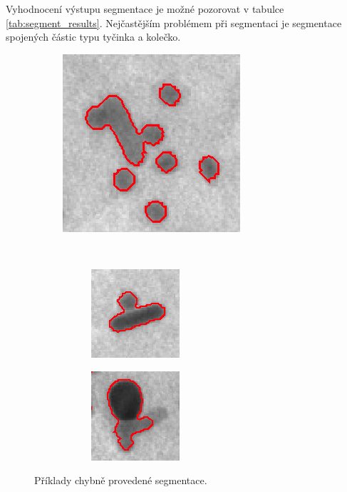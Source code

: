 \documentclass[11pt,twoside,a4paper,table]{book}
\begin{document}
Vyhodnocení výstupu segmentace je možné pozorovat v tabulce \ref{tab:segment_results}. Nejčastějším problémem při segmentaci je segmentace spojených částic typu tyčinka a kolečko.  

\begin{figure}[ht]
	\begin{center}
	\begin{subfigure}[l]{0.45\textwidth}
		\includegraphics[scale=1]{figures/segment_problem1.png}
	\end{subfigure}
	~
	\begin{subfigure}[r]{0.45\textwidth}
		\begin{subfigure}[b]{\textwidth}
			\includegraphics[scale=1]{figures/segment_problem2.png}
		\end{subfigure}
	
		\begin{subfigure}[b]{\textwidth}
			\includegraphics[scale=1]{figures/segment_problem3.png}
		\end{subfigure}
	\end{subfigure}
	\end{center}
	\caption{Příklady chybně provedené segmentace.}
	\label{fig:segment_problems}
\end{figure}
\end{document}
